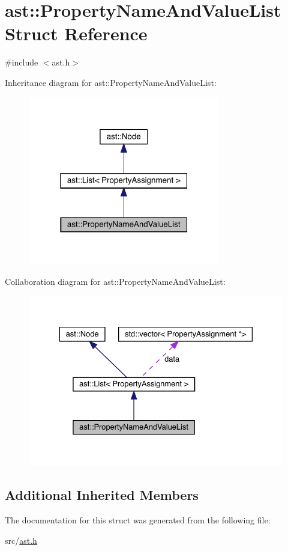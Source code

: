 \hypertarget{structast_1_1_property_name_and_value_list}{}\section{ast\+:\+:Property\+Name\+And\+Value\+List Struct Reference}
\label{structast_1_1_property_name_and_value_list}


{\ttfamily \#include $<$ast.\+h$>$}



Inheritance diagram for ast\+:\+:Property\+Name\+And\+Value\+List\+:
\nopagebreak
\begin{figure}[H]
\begin{center}
\leavevmode
\includegraphics[width=238pt]{structast_1_1_property_name_and_value_list__inherit__graph}
\end{center}
\end{figure}


Collaboration diagram for ast\+:\+:Property\+Name\+And\+Value\+List\+:
\nopagebreak
\begin{figure}[H]
\begin{center}
\leavevmode
\includegraphics[width=330pt]{structast_1_1_property_name_and_value_list__coll__graph}
\end{center}
\end{figure}
\subsection*{Additional Inherited Members}


The documentation for this struct was generated from the following file\+:\begin{DoxyCompactItemize}
\item 
src/\hyperlink{ast_8h}{ast.\+h}\end{DoxyCompactItemize}
